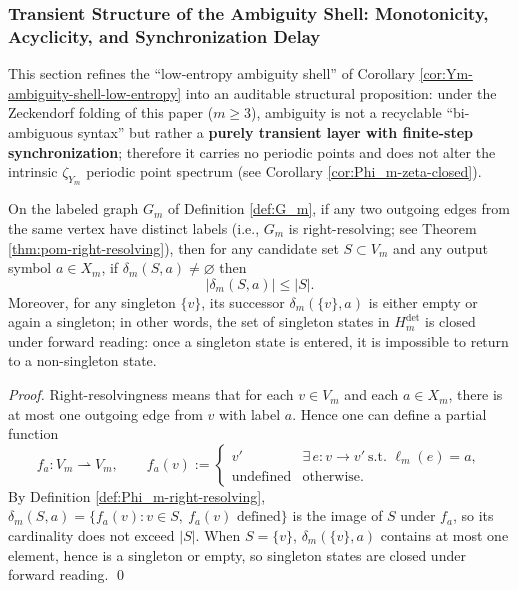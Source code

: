 \subsubsection{Transient Structure of the Ambiguity Shell: Monotonicity, Acyclicity, and Synchronization Delay}\label{subsec:Ym-amb-transient}
This section refines the ``low-entropy ambiguity shell'' of Corollary \ref{cor:Ym-ambiguity-shell-low-entropy} into an auditable structural proposition: under the Zeckendorf folding of this paper ($m\ge 3$), ambiguity is not a recyclable ``bi-ambiguous syntax'' but rather a \textbf{purely transient layer with finite-step synchronization}; therefore it carries no periodic points and does not alter the intrinsic \(\zeta_{Y_m}\) periodic point spectrum (see Corollary \ref{cor:Phi_m-zeta-closed}).

\begin{proposition}\label{prop:det-candidate-set-monotone}
On the labeled graph $G_m$ of Definition \ref{def:G_m}, if any two outgoing edges from the same vertex have distinct labels (i.e., $G_m$ is right-resolving; see Theorem \ref{thm:pom-right-resolving}), then for any candidate set $S\subset V_m$ and any output symbol $a\in X_m$, if $\delta_m(S,a)\neq\varnothing$ then
\[
|\delta_m(S,a)|\le |S|.
\]
Moreover, for any singleton $\{v\}$, its successor $\delta_m(\{v\},a)$ is either empty or again a singleton; in other words, the set of singleton states in $H_m^{\mathrm{det}}$ is closed under forward reading: once a singleton state is entered, it is impossible to return to a non-singleton state.
\end{proposition}
\begin{proof}
Right-resolvingness means that for each $v\in V_m$ and each $a\in X_m$, there is at most one outgoing edge from $v$ with label $a$. Hence one can define a partial function
\[
f_a:V_m\rightharpoonup V_m,\qquad
f_a(v):=
\begin{cases}
v' & \exists\,e:v\to v'\ \text{s.t. }\ell_m(e)=a,\\
\text{undefined} & \text{otherwise}.
\end{cases}
\]
By Definition \ref{def:Phi_m-right-resolving},
\(
\delta_m(S,a)=\{f_a(v):v\in S,\ f_a(v)\text{ defined}\}
\)
is the image of $S$ under $f_a$, so its cardinality does not exceed $|S|$. When $S=\{v\}$, $\delta_m(\{v\},a)$ contains at most one element, hence is a singleton or empty, so singleton states are closed under forward reading. \qed
\end{proof}

